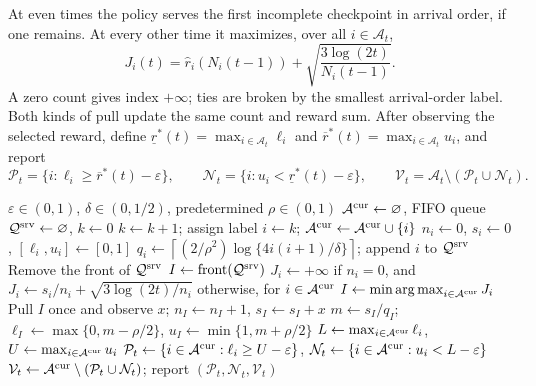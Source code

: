 \documentclass[11pt]{article}
\theoremstyle{remark}
\begin{document}
At even times the policy serves the first incomplete checkpoint in arrival
order, if one remains. At every other time it maximizes, over all
$i\in\mathcal A_t$,
\begin{equation}
 J_i(t)=\hat r_i(N_i(t-1))+
             \sqrt{\frac{3\log(2t)}{N_i(t-1)}}.
 \label{eq:ucb}
\end{equation}
A zero count gives index $+\infty$; ties are broken by the smallest
arrival-order label. Both kinds of pull update the same count and reward
sum. After observing the selected reward, define
$\underline r^*(t)=\max_{i\in\mathcal A_t}\ell_i$ and
$\overline r^*(t)=\max_{i\in\mathcal A_t}u_i$, and report
\begin{equation}
 \mathcal P_t=\{i:\ell_i\ge\overline r^*(t)-\varepsilon\},\qquad
 \mathcal N_t=\{i:u_i<\underline r^*(t)-\varepsilon\},\qquad
 \mathcal V_t=\mathcal A_t\setminus(\mathcal P_t\cup\mathcal N_t).
 \label{eq:reports}
\end{equation}

\begin{algorithm}[p]
\caption{Checkpoint-UCB}
\label{alg:checkpoint-ucb}
\begin{algorithmic}[1]
\Require $\varepsilon\in(0,1)$, $\delta\in(0,1/2)$, predetermined $\rho\in(0,1)$
\State $\mathcal A^{\rm cur}\gets\varnothing$, FIFO queue $\mathcal Q^{\rm srv}\gets\varnothing$, $k\gets0$
    \State $k\gets k+1$; assign label $i\gets k$; $\mathcal A^{\rm cur}\gets\mathcal A^{\rm cur}\cup\{i\}$
    \State $n_i\gets0$, $s_i\gets0$, $[\ell_i,u_i]\gets[0,1]$
    \State $q_i\gets\left\lceil(2/\rho^2)\log\{4i(i+1)/\delta\}\right\rceil$; append $i$ to $\mathcal Q^{\rm srv}$
  \EndFor
    \State Remove the front of $\mathcal Q^{\rm srv}$
  \EndWhile
    \State $I\gets\operatorname{front}(\mathcal Q^{\rm srv})$ 
  \Else
    \State $J_i\gets+\infty$ if $n_i=0$, and $J_i\gets s_i/n_i+\sqrt{3\log(2t)/n_i}$ otherwise, for $i\in\mathcal A^{\rm cur}$
    \State $I\gets\min\operatorname*{arg\,max}_{i\in\mathcal A^{\rm cur}}J_i$
  \EndIf
  \State Pull $I$ once and observe $x$; $n_I\gets n_I+1$, $s_I\gets s_I+x$
    \State $m\gets s_I/q_I$; $\ell_I\gets\max\{0,m-\rho/2\}$, $u_I\gets\min\{1,m+\rho/2\}$
  \EndIf
  \State $L\gets\max_{i\in\mathcal A^{\rm cur}}\ell_i$, $U\gets\max_{i\in\mathcal A^{\rm cur}}u_i$
  \State $\mathcal P_t\gets\{i\in\mathcal A^{\rm cur}:\ell_i\ge U-\varepsilon\}$, $\mathcal N_t\gets\{i\in\mathcal A^{\rm cur}:u_i<L-\varepsilon\}$
  \State $\mathcal V_t\gets\mathcal A^{\rm cur}\setminus(\mathcal P_t\cup\mathcal N_t)$; report $(\mathcal P_t,\mathcal N_t,\mathcal V_t)$
\EndFor
\end{algorithmic}
\end{algorithm}
\end{document}

